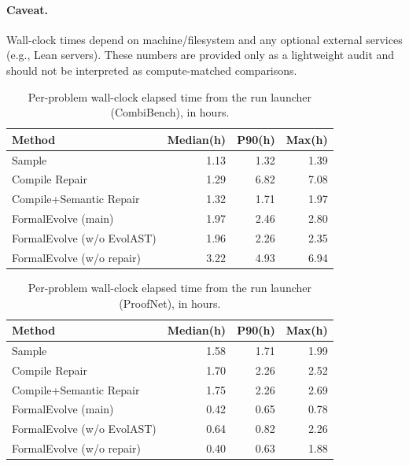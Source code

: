 \documentclass[10pt]{article}
\begin{document}
\paragraph{Caveat.}
Wall-clock times depend on machine/filesystem and any optional external services (e.g., Lean servers). These numbers are provided only as a lightweight audit and should not be interpreted as compute-matched comparisons.

\begin{table}[h]
  \centering
  \caption{Per-problem wall-clock elapsed time from the run launcher (CombiBench), in hours.}
  \label{tab:supp-wallclock-cb}
  \scriptsize
  \begin{tabular}{lrrr}
    \toprule
    Method & Median(h) & P90(h) & Max(h) \\
    \midrule
    Sample & 1.13 & 1.32 & 1.39 \\
    Compile Repair & 1.29 & 6.82 & 7.08 \\
    Compile+Semantic Repair & 1.32 & 1.71 & 1.97 \\
    FormalEvolve (main) & 1.97 & 2.46 & 2.80 \\
    FormalEvolve (w/o EvolAST) & 1.96 & 2.26 & 2.35 \\
    FormalEvolve (w/o repair) & 3.22 & 4.93 & 6.94 \\
    \bottomrule
  \end{tabular}
\end{table}

\begin{table}[h]
  \centering
  \caption{Per-problem wall-clock elapsed time from the run launcher (ProofNet), in hours.}
  \label{tab:supp-wallclock-pn}
  \scriptsize
  \begin{tabular}{lrrr}
    \toprule
    Method & Median(h) & P90(h) & Max(h) \\
    \midrule
    Sample & 1.58 & 1.71 & 1.99 \\
    Compile Repair & 1.70 & 2.26 & 2.52 \\
    Compile+Semantic Repair & 1.75 & 2.26 & 2.69 \\
    FormalEvolve (main) & 0.42 & 0.65 & 0.78 \\
    FormalEvolve (w/o EvolAST) & 0.64 & 0.82 & 2.26 \\
    FormalEvolve (w/o repair) & 0.40 & 0.63 & 1.88 \\
    \bottomrule
  \end{tabular}
\end{table}
\end{document}
